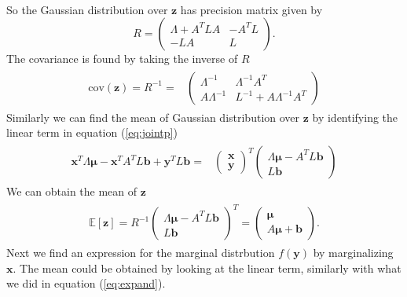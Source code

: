 {\begin{align}
\begin{split}
     \end{split}
\end{align}
So the Gaussian distribution over $\mathbf{z}$ has precision matrix given by 
$$R = \begin{pmatrix} 
        \Lambda+A^{T}LA &-A^{T}L  \\
        -LA & L 
        \end{pmatrix}.$$
The covariance is found by taking the inverse of $R$
\begin{align}
\begin{split}
\text{cov}(\mathbf{z})=R^{-1}= & \begin{pmatrix} 
\Lambda^{-1} & \Lambda^{-1}A^T \\
A\Lambda^{-1} & L^{-1}+A\Lambda^{-1}A^T
\end{pmatrix} 
\end{split}
\end{align}
Similarly we can find the mean of Gaussian distribution over $\mathbf{z}$ by identifying the linear term in equation (\ref{eq:jointp})
\begin{align}
\begin{split}
\mathbf{x}^T\Lambda\mathbf{\mu}-\mathbf{x}^TA^TL\mathbf{b}+\mathbf{y}^TL\mathbf{b} = & \begin{pmatrix} 
\mathbf{x} \\ \mathbf{y} 
\end{pmatrix}^T\begin{pmatrix} 
\Lambda\mathbf{\mu}-A^TL\mathbf{b} \\ L\mathbf{b} 
\end{pmatrix}
\end{split}
\end{align}
We can obtain the mean of $\mathbf{z}$
\begin{align}
\begin{split}
\mathbb{E}[\mathbf{z}] = R^{-1}\begin{pmatrix} 
\Lambda\mathbf{\mu}-A^TL\mathbf{b} \\ L\mathbf{b} 
\end{pmatrix}^T
= \begin{pmatrix} 
\mathbf{\mu} \\ A\mathbf{\mu}+\mathbf{b}
\end{pmatrix}.
\end{split}
\end{align}
Next we find an expression for the marginal distrbution $f(\mathbf{y})$ by marginalizing $\mathbf{x}$. The mean could be obtained by looking at the linear term, similarly with what we did in equation (\ref{eq:expand}).
}
